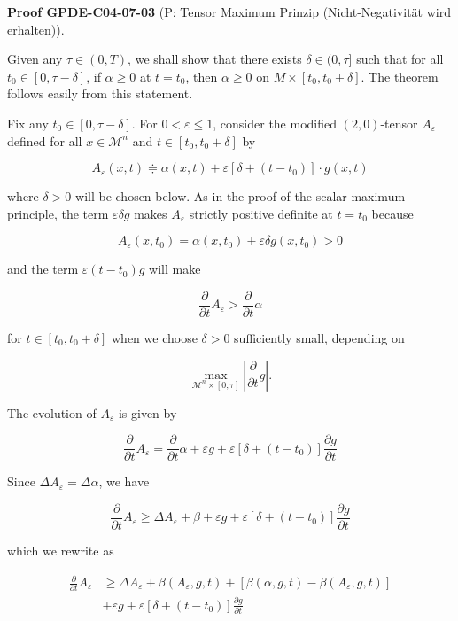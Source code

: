 \documentclass[10pt, letterpaper]{article}
\newcommand{\CustomHeading}[3]{%
  \par\medskip\noindent%
  \textbf{#1 #2} \textnormal{(#3)}.\enskip%
}
\newenvironment{PROOF}[2]{\begin{unitbox}\CustomHeading{Proof}{#1}{#2}}{\end{unitbox}}
\begin{document}
\begin{PROOF}{GPDE-C04-07-03}{P: Tensor Maximum Prinzip (Nicht-Negativität wird erhalten)}
Given any $\tau \in(0, T)$, we shall show that there exists $\delta \in(0, \tau]$ such that for all $t_0 \in[0, \tau-\delta]$, if $\alpha \geq 0$ at $t=t_0$, then $\alpha \geq 0$ on $M \times\left[t_0, t_0+\delta\right]$. The theorem follows easily from this statement.

Fix any $t_0 \in[0, \tau-\delta]$. For $0<\varepsilon \leq 1$, consider the modified $(2,0)$-tensor $A_{\varepsilon}$ defined for all $x \in \mathcal{M}^n$ and $t \in\left[t_0, t_0+\delta\right]$ by

$$
A_{\varepsilon}(x, t) \doteqdot \alpha(x, t)+\varepsilon\left[\delta+\left(t-t_0\right)\right] \cdot g(x, t)
$$

where $\delta>0$ will be chosen below. As in the proof of the scalar maximum principle, the term $\varepsilon \delta g$ makes $A_{\varepsilon}$ strictly positive definite at $t=t_0$ because

$$
A_{\varepsilon}\left(x, t_0\right)=\alpha\left(x, t_0\right)+\varepsilon \delta g\left(x, t_0\right)>0
$$

and the term $\varepsilon\left(t-t_0\right) g$ will make

$$
\frac{\partial}{\partial t} A_{\varepsilon}>\frac{\partial}{\partial t} \alpha
$$


for $t \in\left[t_0, t_0+\delta\right]$ when we choose $\delta>0$ sufficiently small, depending on

$$
\max _{\mathcal{M}^n \times[0, \tau]}\left|\frac{\partial}{\partial t} g\right| .
$$


The evolution of $A_{\varepsilon}$ is given by

$$
\frac{\partial}{\partial t} A_{\varepsilon}=\frac{\partial}{\partial t} \alpha+\varepsilon g+\varepsilon\left[\delta+\left(t-t_0\right)\right] \frac{\partial g}{\partial t}
$$


Since $\Delta A_{\varepsilon}=\Delta \alpha$, we have

$$
\frac{\partial}{\partial t} A_{\varepsilon} \geq \Delta A_{\varepsilon}+\beta+\varepsilon g+\varepsilon\left[\delta+\left(t-t_0\right)\right] \frac{\partial g}{\partial t}
$$

which we rewrite as

$$
\begin{aligned}
\frac{\partial}{\partial t} A_{\varepsilon} & \geq \Delta A_{\varepsilon}+\beta\left(A_{\varepsilon}, g, t\right)+\left[\beta(\alpha, g, t)-\beta\left(A_{\varepsilon}, g, t\right)\right] \\
& +\varepsilon g+\varepsilon\left[\delta+\left(t-t_0\right)\right] \frac{\partial g}{\partial t}
\end{aligned}
$$



\end{PROOF}
\end{document}

